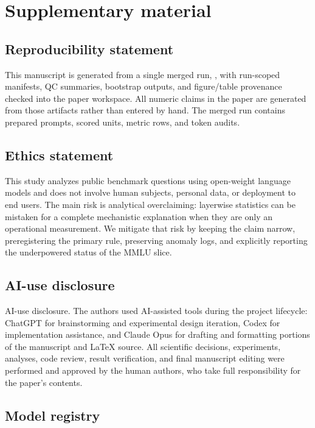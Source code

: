 \section{Supplementary material}

\subsection{Reproducibility statement}

This manuscript is generated from a single merged run, \texttt{\MergedRunId}, with run-scoped manifests, QC summaries, bootstrap outputs, and figure/table provenance checked into the paper workspace. All numeric claims in the paper are generated from those artifacts rather than entered by hand. The merged run contains \PreparedExampleCount{} prepared prompts, \ScoreRowCount{} scored units, \MetricRowCount{} metric rows, and \TokenAuditCount{} token audits.

\subsection*{Ethics statement}

This study analyzes public benchmark questions using open-weight language models and does not involve human subjects, personal data, or deployment to end users. The main risk is analytical overclaiming: layerwise statistics can be mistaken for a complete mechanistic explanation when they are only an operational measurement. We mitigate that risk by keeping the claim narrow, preregistering the primary rule, preserving anomaly logs, and explicitly reporting the underpowered status of the MMLU slice.

\subsection*{AI-use disclosure}

AI-use disclosure. The authors used AI-assisted tools during the project lifecycle: ChatGPT for brainstorming and experimental design iteration, Codex for implementation assistance, and Claude Opus for drafting and formatting portions of the manuscript and LaTeX source. All scientific decisions, experiments, analyses, code review, result verification, and final manuscript editing were performed and approved by the human authors, who take full responsibility for the paper’s contents.

\subsection{Model registry}

